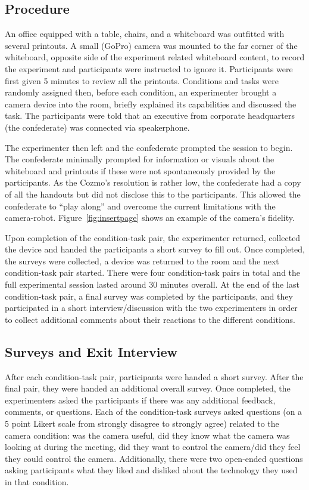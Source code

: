 \documentclass{tufte-handout}
\begin{document}
\subsection{Procedure}
An office equipped with a table, chairs, and a whiteboard was
outfitted with several printouts. A small (GoPro) camera was mounted
to the far corner of the whiteboard, opposite side of the experiment
related whiteboard content, to record the experiment and participants
were instructed to ignore it.  Participants were first given 5 minutes
to review all the printouts. Conditions and tasks were randomly
assigned then, before each condition, an experimenter brought a camera
device into the room, briefly explained its capabilities and discussed
the task. The participants were told that an executive from corporate
headquarters (the confederate) was connected via speakerphone.

The experimenter then left and the confederate prompted the session to
begin.  The confederate minimally prompted for information or visuals
about the whiteboard and printouts if these were not spontaneously
provided by the participants. As the Cozmo's resolution is rather low,
the confederate had a copy of all the handouts but did not disclose
this to the participants. This allowed the confederate to ``play
along'' and overcome the current limitations with the camera-robot.
Figure~\ref{fig:insertpage} shows an example of the camera's fidelity.

Upon completion of the condition-task pair, the experimenter returned,
collected the device and handed the participants a short survey to
fill out.  Once completed, the surveys were collected, a device was
returned to the room and the next condition-task pair started.  There
were four condition-task pairs in total and the full experimental
session lasted around 30 minutes overall. At the end of the last
condition-task pair, a final survey was completed by the participants,
and they participated in a short interview/discussion with the two
experimenters in order to collect additional comments about their
reactions to the different conditions.

\subsection{Surveys and Exit Interview}
After each condition-task pair, participants were handed a short
survey.  After the final pair, they were handed an additional overall
survey. Once completed, the experimenters asked the participants if
there was any additional feedback, comments, or questions. Each of the
condition-task surveys asked questions (on a 5 point Likert scale from
strongly disagree to strongly agree) related to the camera condition:
was the camera useful, did they know what the camera was looking at
during the meeting, did they want to control the camera/did they feel
they could control the camera. Additionally, there were two open-ended
questions asking participants what they liked and disliked about the
technology they used in that condition.
\end{document}

